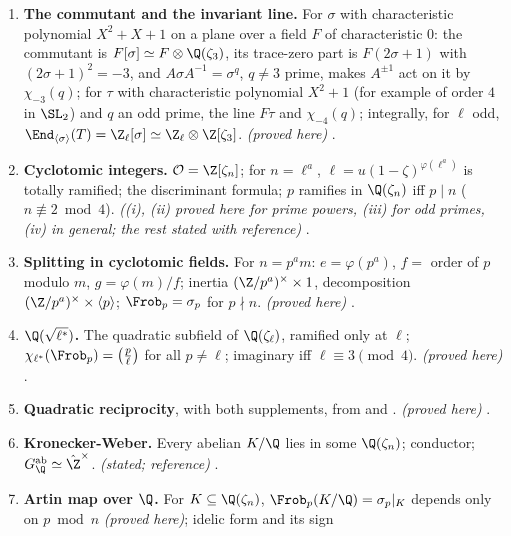 \begin{enumerate}[label=\textbf{\thechapter.\arabic*}]
(e.g. $g\in\SL_2(\Z_\ell)$ of order $m$): $\Z_\ell[g]\simeq\Z_\ell[X]/(\Phi_m)$, the lattice is free of rank one over it, and the commutant of $g$ is $\Z_\ell[g]$.
\emph{(proved here)} .
\item \textbf{The commutant and the invariant line.} For $\sigma$ with characteristic polynomial $X^2+X+1$ on a plane over a field $F$ of characteristic $0$:
the commutant is $F[\sigma]\simeq F\otimes\Q(\zeta_3)$, its trace-zero part is $F(2\sigma+1)$ with $(2\sigma+1)^2=-3$, and $A\sigma A^{-1}=\sigma^q$, $q\ne3$ prime,
makes $A^{\pm1}$ act on it by $\chi_{-3}(q)$; for $\tau$ with characteristic polynomial $X^2+1$ (for example of order $4$ in $\SL_2$) and $q$ an odd prime, the line $F\tau$ and $\chi_{-4}(q)$; integrally, for $\ell$ odd,
$\End_{\langle\sigma\rangle}(T)=\Z_\ell[\sigma]\simeq\Z_\ell\otimes\Z[\zeta_3]$.
\emph{(proved here)} .
\item \textbf{Cyclotomic integers.} $\mathcal O=\Z[\zeta_n]$; for $n=\ell^a$, $\ell=u(1-\zeta)^{\varphi(\ell^a)}$ is totally ramified; the discriminant formula; $p$ ramifies in
$\Q(\zeta_n)$ iff $p\mid n$ ($n\not\equiv2\bmod4$). \emph{((i), (ii) proved here for prime powers, (iii) for odd primes, (iv) in general; the rest stated with reference)} .
\item \textbf{Splitting in cyclotomic fields.} For $n=p^am$: $e=\varphi(p^a)$, $f=$ order of $p$ modulo $m$, $g=\varphi(m)/f$; inertia $(\Z/p^a)^\times\times1$, decomposition
$(\Z/p^a)^\times\times\langle p\rangle$; $\Frob_p=\sigma_p$ for $p\nmid n$. \emph{(proved here)} .
\item \textbf{$\Q(\sqrt{\ell^*})$.} The quadratic subfield of $\Q(\zeta_\ell)$, ramified only at $\ell$; $\chi_{\ell^*}(\Frob_p)=\bigl(\frac p\ell\bigr)$ for all $p\ne\ell$; imaginary iff
$\ell\equiv3\pmod4$. \emph{(proved here)} .
\item \textbf{Quadratic reciprocity}, with both supplements, from  and . \emph{(proved here)} .
\item \textbf{Kronecker-Weber.} Every abelian $K/\Q$ lies in some $\Q(\zeta_n)$; conductor; $G_\Q^{\mathrm{ab}}\simeq\hat\Z^\times$. \emph{(stated; reference)}
.
\item \textbf{Artin map over $\Q$.} For $K\subseteq\Q(\zeta_n)$, $\Frob_p(K/\Q)=\sigma_p|_K$ depends only on $p\bmod n$ \emph{(proved here)}; idelic form and its sign

\end{enumerate}
